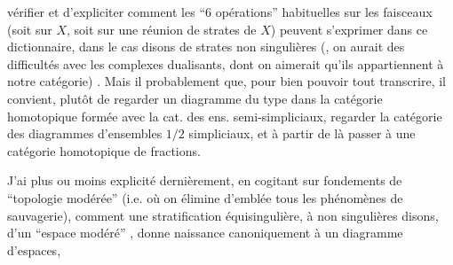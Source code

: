 vérifier et d'expliciter comment les ``6 opérations'' habituelles sur les faisceaux (soit sur $X$, soit sur une réunion de strates de $X$) peuvent s'exprimer dans ce dictionnaire, dans le cas disons de strates non singulières (, on aurait des difficultés avec les complexes dualisants, dont on aimerait qu'ils appartiennent à notre catégorie) . Mais il  probablement que, pour bien pouvoir tout transcrire, il convient, plutôt  de regarder un diagramme du type
\diagram{\begin{tikzcd}[ampersand replacement=\&,column sep=1.4em,row sep=1.2em]
\cdot \arrow[r] \arrow[d] \& {} \\
{} \& {}
\end{tikzcd}}
dans la catégorie homotopique formée avec la cat. des ens. semi-simpliciaux,  regarder la catégorie des diagrammes d'ensembles $1/2$ simpliciaux, et à partir de là passer à une catégorie homotopique de fractions.

J'ai plus ou moins explicité dernièrement, en cogitant sur  fondements de ``topologie modérée'' (i.e. où on élimine d'emblée tous les phénomènes de sauvagerie), comment une stratification équisingulière, à  non singulières disons, d'un ``espace modéré'' , donne naissance canoniquement à un diagramme  d'espaces,
